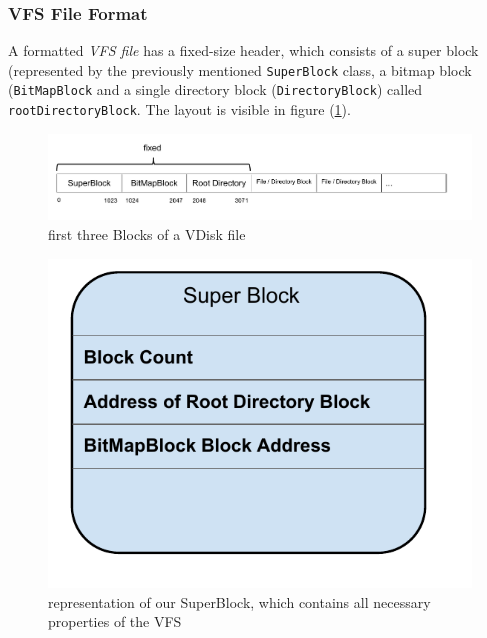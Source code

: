 \documentclass[a4paper,12pt]{article}
\begin{document}
\subsubsection{VFS File Format}
A formatted \emph{VFS file} has a fixed-size header, which consists of a super block (represented by the previously mentioned \texttt{SuperBlock} class, a bitmap block (\texttt{BitMapBlock} and a single directory block (\texttt{DirectoryBlock}) called \texttt{rootDirectoryBlock}. The layout is visible in figure (\ref{vdiskheader}).

\begin{figure}[h]
\begin{center}
\includegraphics[scale=0.6]{images/VDiskHeader.pdf}
\caption{first three Blocks of a VDisk file}
\label{vdiskheader}
\end{center}
\end{figure}

\begin{figure}[h]
\begin{center}
\includegraphics[scale=0.5]{images/SuperBlock.pdf}
\caption{representation of our SuperBlock, which contains all necessary properties of the VFS}
\label{superblock}
\end{center}
\end{figure}
\end{document}
